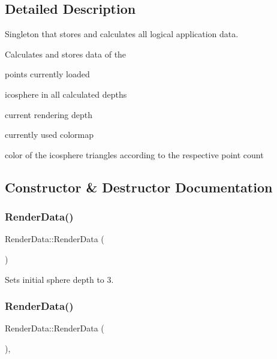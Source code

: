 \subsection{Detailed Description}
Singleton that stores and calculates all logical application data. 

Calculates and stores data of the
\begin{DoxyItemize}
\item points currently loaded
\item icosphere in all calculated depths
\item current rendering depth
\item currently used colormap
\item color of the icosphere triangles according to the respective point count 
\end{DoxyItemize}

\subsection{Constructor \& Destructor Documentation}
\mbox{\label{class_render_data_a16b04b2437ea3fa034381a138cbf2f83}} 
\subsubsection{\texorpdfstring{Render\+Data()}{RenderData()}\hspace{0.1cm}{\footnotesize\ttfamily [1/2]}}
{\footnotesize\ttfamily Render\+Data\+::\+Render\+Data (\begin{DoxyParamCaption}{ }\end{DoxyParamCaption})\hspace{0.3cm}{\ttfamily [private]}}



Sets initial sphere depth to 3. 

\mbox{\label{class_render_data_ab5f9324f666abc4b85fd2c6ed868c6be}} 
\subsubsection{\texorpdfstring{Render\+Data()}{RenderData()}\hspace{0.1cm}{\footnotesize\ttfamily [2/2]}}
{\footnotesize\ttfamily Render\+Data\+::\+Render\+Data (\begin{DoxyParamCaption}\item[{const \hyperlink{class_render_data}{Render\+Data} \&}]{ }\end{DoxyParamCaption})\hspace{0.3cm}{\ttfamily [private]}, {\ttfamily [delete]}}



